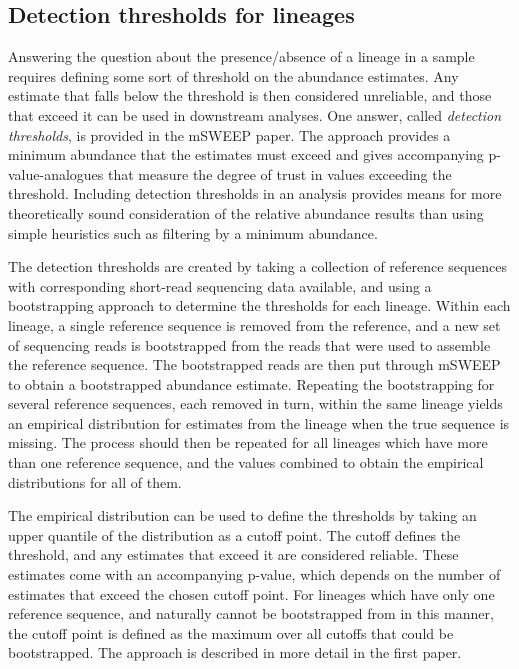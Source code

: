 \documentclass[officiallayout]{tktla}
\begin{document}
\subsection{Detection thresholds for lineages}
Answering the question about the presence/absence of a lineage in a
sample requires defining some sort of threshold on the abundance
estimates. Any estimate that falls below the threshold is then
considered unreliable, and those that exceed it can be used in
downstream analyses. One answer, called \textit{detection thresholds},
is provided in the mSWEEP paper. The approach provides a minimum
abundance that the estimates must exceed and gives accompanying
p-value-analogues that measure the degree of trust in values exceeding
the threshold. Including detection thresholds in an analysis provides
means for more theoretically sound consideration of the relative
abundance results than using simple heuristics such as filtering by a
minimum abundance.

The detection thresholds are created by taking a collection of
reference sequences with corresponding short-read sequencing data
available, and using a bootstrapping approach to determine the
thresholds for each lineage. Within each lineage, a single reference
sequence is removed from the reference, and a new set of sequencing
reads is bootstrapped from the reads that were used to assemble the
reference sequence. The bootstrapped reads are then put through mSWEEP
to obtain a bootstrapped abundance estimate. Repeating the
bootstrapping for several reference sequences, each removed in turn,
within the same lineage yields an empirical distribution for estimates
from the lineage when the true sequence is missing. The process should
then be repeated for all lineages which have more than one reference
sequence, and the values combined to obtain the empirical
distributions for all of them.

The empirical distribution can be used to define the thresholds by
taking an upper quantile of the distribution as a cutoff point. The
cutoff defines the threshold, and any estimates that exceed it are
considered reliable. These estimates come with an accompanying
p-value, which depends on the number of estimates that exceed the
chosen cutoff point. For lineages which have only one reference
sequence, and naturally cannot be bootstrapped from in this manner,
the cutoff point is defined as the maximum over all cutoffs that could
be bootstrapped. The approach is described in more detail in the first
paper.
\end{document}
